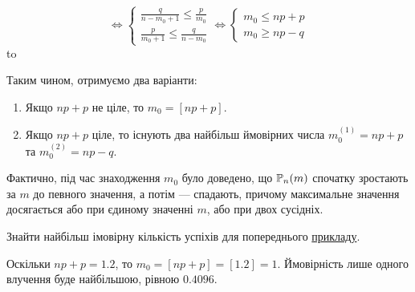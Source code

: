 $$
\Leftrightarrow
\begin{cases}
    \frac{q}{n-m_0+1} \leq \frac{p}{m_0} \\
    \frac{p}{m_0 + 1} \leq \frac{q}{n-m_0}
\end{cases}
\Leftrightarrow
\begin{cases}
    m_0 \leq np+p\\
    m_0 \geq np-q
\end{cases}
$$
\hbox to 

Таким чином, отримуємо два варіанти:
\begin{enumerate}
    \item Якщо $np+p$ не ціле, то $m_0 = \left[np+p\right]$.
    \item Якщо $np+p$ ціле, то існують два найбільш ймовірних числа $m_0^{(1)} = np+p$ та $m_0^{(2)} = np-q$.
\end{enumerate}

\begin{remark}
    Фактично, під час знаходження $m_0$ було доведено, що $\P_n(m)$ спочатку зростають за $m$ до певного значення, 
    а потім --- спадають, причому максимальне значення досягається або при єдиному значенні $m$,
    або при двох сусідніх.
\end{remark}

\begin{example}
    Знайти найбільш імовірну кількість успіхів для попереднього \hyperref[ex:sportsman]{прикладу}.

    Оскільки $np + p = 1.2$, то $m_0 = \left[np + p\right] = \left[1.2\right] = 1$.
    Ймовірність лише одного влучення буде найбільшою, рівною $0.4096$.
\end{example}

